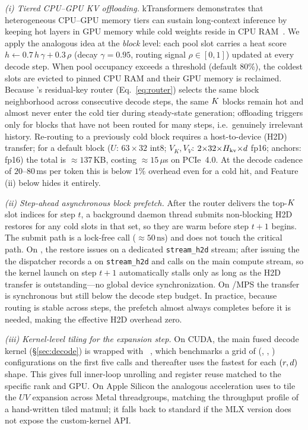 \emph{(i) Tiered CPU--GPU KV offloading.}
kTransformers demonstrates that heterogeneous CPU--GPU memory tiers can sustain long-context
inference by keeping hot layers in GPU memory while cold weights reside in CPU
RAM~\cite{yang2025ktransformers}. We apply the analogous idea at the \emph{block} level: each
pool slot carries a heat score $h \leftarrow 0.7\,h\,\gamma + 0.3\,\rho$ (decay $\gamma{=}0.95$,
routing signal $\rho{\in}[0,1]$) updated at every decode step.
When pool occupancy exceeds a threshold (default $80\%$), the coldest slots are evicted
to pinned CPU RAM and their GPU memory is reclaimed. Because \dkv{}'s residual-key router
(Eq.~\eqref{eq:router}) selects the same block neighborhood across consecutive decode steps, the same $K$ blocks
remain hot and almost never enter the cold tier during steady-state generation; offloading
triggers only for blocks that have not been routed for many steps, i.e.\ genuinely irrelevant
history. Re-routing to a previously cold block requires a host-to-device (H2D) transfer; for a
default block (${U}$: $63{\times}32$ int8; ${V_K,V_V}$: $2{\times}32{\times}H_{\mathrm{kv}}{\times}d$
fp16; anchors: fp16) the total is ${\approx}137$\,KB, costing ${\approx}15\,\mu$s on PCIe~4.0.
At the decode cadence of $20$--$80$\,ms per token this is below $1\%$ overhead even for a cold
hit, and Feature (ii) below hides it entirely.

\emph{(ii) Step-ahead asynchronous block prefetch.}
After the router delivers the top-$K$ slot indices for step $t$, a background daemon thread
submits non-blocking H2D restores for any cold slots in that set, so they are warm before step
$t{+}1$ begins. The submit path is a lock-free  call
(${\approx}50\,\text{ns}$) and does not touch the critical path.
On \cuda{}, the restore issues on a dedicated \texttt{stream\_h2d} stream; after issuing the
 the dispatcher records a  on \texttt{stream\_h2d} and
calls  on the main compute stream, so the kernel launch on step $t{+}1$
automatically stalls only as long as the H2D transfer is outstanding---no global device
synchronization. On \mlxe{}/MPS the transfer is synchronous but still below the decode step
budget. In practice, because routing is stable across steps, the prefetch almost always completes
before it is needed, making the effective H2D overhead zero.

\emph{(iii) Kernel-level tiling for the expansion step.}
On CUDA, the main fused decode kernel (\S\ref{sec:decode}) is wrapped with
~\cite{tillet2019triton}, which benchmarks a grid of
(, , ) configurations on the
first five calls and thereafter uses the fastest for each $(r, d)$ shape. This gives
full inner-loop unrolling and register reuse matched to the specific rank and GPU. On Apple
Silicon the analogous acceleration uses  to tile the $U V$
expansion across Metal threadgroups, matching the throughput profile of a hand-written
tiled matmul; it falls back to standard  if the MLX version does not
expose the custom-kernel API.

